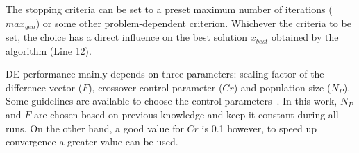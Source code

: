
The stopping criteria can be set to a preset maximum number of iterations ($max_{gen}$) or some other problem-dependent criterion. Whichever the criteria to be set, the choice has a direct influence on the best solution $x_{best}$ obtained by the algorithm (Line 12). 

DE performance mainly depends on three parameters: scaling factor of the difference vector ($F$), crossover control parameter ($Cr$) and population size ($N_P$). Some guidelines are available to choose the control parameters~\cite{Price:2005}. In this work, $N_P$ and $F$ are chosen  based  on  previous  knowledge  and  keep  it  constant during all runs. %
On the other hand, a good value for $Cr$ is 0.1 however, to speed up convergence a greater value can be used.